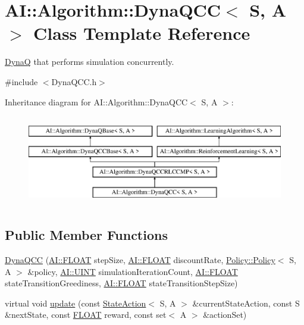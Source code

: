 \hypertarget{classAI_1_1Algorithm_1_1DynaQCC}{\section{A\-I\-:\-:Algorithm\-:\-:Dyna\-Q\-C\-C$<$ S, A $>$ Class Template Reference}
\label{classAI_1_1Algorithm_1_1DynaQCC}
}


\hyperlink{classAI_1_1Algorithm_1_1DynaQ}{Dyna\-Q} that performs simulation concurrently.  




{\ttfamily \#include $<$Dyna\-Q\-C\-C.\-h$>$}

Inheritance diagram for A\-I\-:\-:Algorithm\-:\-:Dyna\-Q\-C\-C$<$ S, A $>$\-:\begin{figure}[H]
\begin{center}
\leavevmode
\includegraphics[height=4.000000cm]{classAI_1_1Algorithm_1_1DynaQCC}
\end{center}
\end{figure}
\subsection*{Public Member Functions}
\begin{DoxyCompactItemize}
\item 
\hyperlink{classAI_1_1Algorithm_1_1DynaQCC_aab347f88243e3690cbc856347ed37378}{Dyna\-Q\-C\-C} (\hyperlink{namespaceAI_a41b74884a20833db653dded3918e05c3}{A\-I\-::\-F\-L\-O\-A\-T} step\-Size, \hyperlink{namespaceAI_a41b74884a20833db653dded3918e05c3}{A\-I\-::\-F\-L\-O\-A\-T} discount\-Rate, \hyperlink{classAI_1_1Algorithm_1_1Policy_1_1Policy}{Policy\-::\-Policy}$<$ S, A $>$ \&policy, \hyperlink{namespaceAI_ab6e14dc1e659854858a87e511f1439ec}{A\-I\-::\-U\-I\-N\-T} simulation\-Iteration\-Count, \hyperlink{namespaceAI_a41b74884a20833db653dded3918e05c3}{A\-I\-::\-F\-L\-O\-A\-T} state\-Transition\-Greediness, \hyperlink{namespaceAI_a41b74884a20833db653dded3918e05c3}{A\-I\-::\-F\-L\-O\-A\-T} state\-Transition\-Step\-Size)
\item 
virtual void \hyperlink{classAI_1_1Algorithm_1_1DynaQCC_ae23b8f0afbb9fc5024aef9ce720c9b84}{update} (const \hyperlink{classAI_1_1StateAction}{State\-Action}$<$ S, A $>$ \&current\-State\-Action, const S \&next\-State, const \hyperlink{namespaceAI_a41b74884a20833db653dded3918e05c3}{F\-L\-O\-A\-T} reward, const set$<$ A $>$ \&action\-Set)
\end{DoxyCompactItemize}
